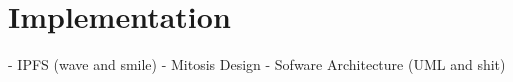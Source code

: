 \chapter{Implementation}
- IPFS (wave and smile)
- Mitosis Design
- Sofware Architecture (UML and shit)
